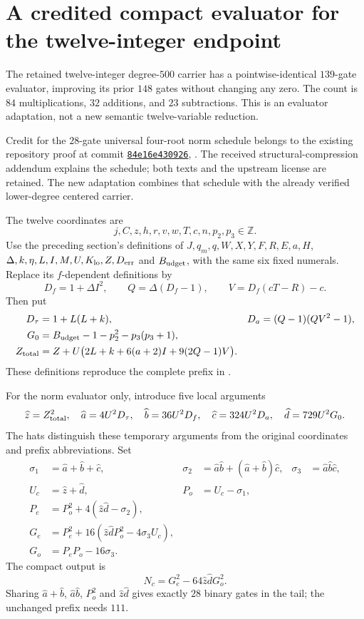\section{A credited compact evaluator for the twelve-integer endpoint}
The retained twelve-integer degree-$500$ carrier has a pointwise-identical
$139$-gate evaluator, improving its prior $148$ gates without changing any zero.
The count is $84$ multiplications, $32$ additions, and $23$ subtractions.
This is an evaluator adaptation, not a new semantic twelve-variable reduction.

Credit for the $28$-gate universal four-root norm schedule belongs to the
existing repository proof at commit
\href{https://github.com/VladimirReshetnikov/ProveIt/commit/84e16e43092614bae262ca59651cb9d77e31a255}{\texttt{84e16e430926}},
.
The received structural-compression addendum explains the schedule; both
texts and the upstream license are retained. The new adaptation combines
that schedule with the already verified lower-degree centered carrier.

The twelve coordinates are
\[
 j,C,z,h,r,v,w,T,c,n,p_2,p_3\in\mathbb Z.
\]
Use the preceding section's definitions of $J,q_m,q,W,X,Y,F,R,E,a,H$,
$\Delta,k,\eta,L,I,M,U,K_{\rm lo},Z,D_{\rm err}$ and
$B_{\rm udget}$, with the same six fixed numerals. Replace its
$f$-dependent definitions by
\[
 D_f=1+\Delta I^2,\qquad Q=\Delta(D_f-1),\qquad
 V=D_f(cT-R)-c.
\]
Then put
\begin{align*}
 D_\tau&=1+L(L+k),&D_a&=(Q-1)(QV^2-1),\\
 G_0&=B_{\rm udget}-1-p_2^2-p_3(p_3+1),\\
 Z_{\rm total}&=Z+U\bigl(2L+k+6(a+2)I+9(2Q-1)V\bigr).
\end{align*}
These definitions reproduce the complete prefix in
.

For the norm evaluator only, introduce five local arguments
\[
 \widehat z=Z_{\rm total}^2,\quad \widehat a=4U^2D_\tau,
 \quad \widehat b=36U^2D_f,\quad
 \widehat c=324U^2D_a,\quad \widehat d=729U^2G_0.
\]
The hats distinguish these temporary arguments from the original coordinates
and prefix abbreviations. Set
\begin{align*}
 \sigma_1&=\widehat a+\widehat b+\widehat c,
 &\sigma_2&=\widehat a\widehat b+(\widehat a+\widehat b)\widehat c,
 &\sigma_3&=\widehat a\widehat b\widehat c,\\
 U_c&=\widehat z+\widehat d,&P_o&=U_c-\sigma_1,\\
 P_e&=P_o^2+4(\widehat z\widehat d-\sigma_2),\\
 G_e&=P_e^2+16(\widehat z\widehat dP_o^2-4\sigma_3U_c),\\
 G_o&=P_eP_o-16\sigma_3.
\end{align*}
The compact output is
\[
 \boxed{N_c=G_e^2-64\widehat z\widehat dG_o^2.}
\]
Sharing $\widehat a+\widehat b$, $\widehat a\widehat b$, $P_o^2$ and
$\widehat z\widehat d$ gives exactly $28$ binary gates in the tail;
the unchanged prefix needs $111$.

